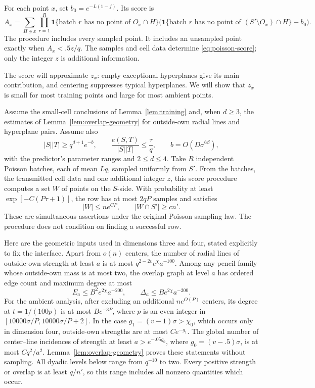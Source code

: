 For each point \(x\), set \(b_0=e^{-L(1-f)}\).  Its score is
\begin{equation}
 A_x=\sum_{H\ni x}\prod_{r=1}^R
 \mathbf1\{\text{batch }r\text{ has no point of }O_x\cap H\}
 \bigl(\mathbf1\{\text{batch }r\text{ has no point of }(S'\setminus O_x)
                                      \cap H\}-b_0\bigr).
 \label{eq:poisson-score}
\end{equation}
The procedure includes every sampled point.  It includes an unsampled
point exactly when \(A_x<.5z/q\).  The samples and cell data determine
\eqref{eq:poisson-score}; only the integer \(z\) is additional information.

The score will approximate $z_x$: empty exceptional hyperplanes give
its main contribution, and centering suppresses typical hyperplanes.
We will show that $z_x$ is small for most training points and large
for most ambient points.

\begin{lemma}
\label{lem:score-procedure}
Assume the small-cell conclusions of Lemma~\ref{lem:training}
and, when \(d\ge3\), the estimates of
Lemma~\ref{lem:overlap-geometry} for outside-own radial lines and hyperplane
pairs.  Assume also
\[
 |S||T|\ge q^{d+1}e^{-b},\qquad
 \frac{e(S,T)}{|S||T|}\le\frac{\tau}{q},\qquad
 b=O(D\sigma^{6\beta}),
\]
with the predictor's parameter ranges and \(2\le d\le4\).
Take \(R\) independent Poisson batches, each of mean \(Lq\), sampled
uniformly from \(S'\).  From the batches, the transmitted cell data and
one additional integer \(z\), this score procedure computes a set
\(W\) of points on the \(S\)-side.  With probability at least
\(\exp[-C(P\tau+1)]\), the row has at most \(2qP\) samples and satisfies
\[
 |W|\le n e^{CP},\qquad |W\cap S'|\ge c n'.
\]
These are simultaneous assertions under the original Poisson sampling
law.  The procedure does not condition on finding a successful row.
\end{lemma}

Here are the geometric inputs used in dimensions three and four, stated
explicitly to fix the interface.  Apart from \(o(n)\) centers, the number of radial lines
of outside-own strength at least \(a\) is at most
\(q^{2-2v}e^\chi a^{-100}\).  Among any pencil family whose outside-own
mass is at most two, the overlap graph at level \(a\) has ordered edge
count and maximum degree at most
\begin{equation}
 E_a\le B^2e^{2\chi}a^{-200},\qquad
 \Delta_a\le Be^{2\chi}a^{-200}.
 \label{eq:score-geometric-inputs}
\end{equation}
For the ambient analysis, after excluding an additional \(ne^{O(P)}\)
centers, its degree at \(t=1/(100p)\) is at most \(Be^{-3P}\), where \(p\)
is an even integer in \([10000\sigma/P,10000\sigma/P+2]\).
In the case \(g_1=(v-1)\sigma>\chi_0\), which occurs only in dimension
four, outside-own strengths are at most \(Ce^{-g_1}\).  The global number
of center--line incidences of strength at least \(a>e^{-.05g_0}\), where
\(g_0=(v-.5)\sigma\), is at most \(Cq^2/a^2\).
Lemma~\ref{lem:overlap-geometry} proves these statements without sampling.
All dyadic levels below range from \(q^{-10}\) to two.  Every positive
strength or overlap is at least \(q/n'\), so this range includes all
nonzero quantities which occur.

